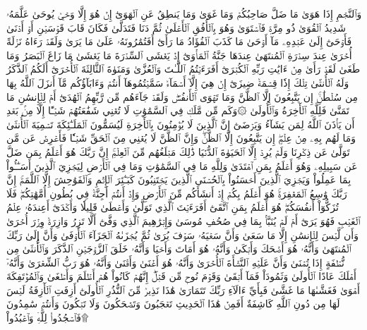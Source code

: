 وَٱلنَّجۡمِ إِذَا هَوَىٰ
مَا ضَلَّ صَاحِبُكُمۡ وَمَا غَوَىٰ
وَمَا يَنطِقُ عَنِ ٱلۡهَوَىٰٓ
إِنۡ هُوَ إِلَّا وَحۡيٞ يُوحَىٰ
عَلَّمَهُۥ شَدِيدُ ٱلۡقُوَىٰ
ذُو مِرَّةٖ فَٱسۡتَوَىٰ
وَهُوَ بِٱلۡأُفُقِ ٱلۡأَعۡلَىٰ
ثُمَّ دَنَا فَتَدَلَّىٰ
فَكَانَ قَابَ قَوۡسَيۡنِ أَوۡ أَدۡنَىٰ
فَأَوۡحَىٰٓ إِلَىٰ عَبۡدِهِۦ مَآ أَوۡحَىٰ
مَا كَذَبَ ٱلۡفُؤَادُ مَا رَأَىٰٓ
أَفَتُمَٰرُونَهُۥ عَلَىٰ مَا يَرَىٰ
وَلَقَدۡ رَءَاهُ نَزۡلَةً أُخۡرَىٰ
عِندَ سِدۡرَةِ ٱلۡمُنتَهَىٰ
عِندَهَا جَنَّةُ ٱلۡمَأۡوَىٰٓ
إِذۡ يَغۡشَى ٱلسِّدۡرَةَ مَا يَغۡشَىٰ
مَا زَاغَ ٱلۡبَصَرُ وَمَا طَغَىٰ
لَقَدۡ رَأَىٰ مِنۡ ءَايَٰتِ رَبِّهِ ٱلۡكُبۡرَىٰٓ
أَفَرَءَيۡتُمُ ٱللَّـٰتَ وَٱلۡعُزَّىٰ
وَمَنَوٰةَ ٱلثَّالِثَةَ ٱلۡأُخۡرَىٰٓ
أَلَكُمُ ٱلذَّكَرُ وَلَهُ ٱلۡأُنثَىٰ
تِلۡكَ إِذٗا قِسۡمَةٞ ضِيزَىٰٓ
إِنۡ هِيَ إِلَّآ أَسۡمَآءٞ سَمَّيۡتُمُوهَآ أَنتُمۡ وَءَابَآؤُكُم مَّآ أَنزَلَ ٱللَّهُ بِهَا مِن سُلۡطَٰنٍۚ إِن يَتَّبِعُونَ إِلَّا ٱلظَّنَّ وَمَا تَهۡوَى ٱلۡأَنفُسُۖ وَلَقَدۡ جَآءَهُم مِّن رَّبِّهِمُ ٱلۡهُدَىٰٓ
أَمۡ لِلۡإِنسَٰنِ مَا تَمَنَّىٰ
فَلِلَّهِ ٱلۡأٓخِرَةُ وَٱلۡأُولَىٰ
۞وَكَم مِّن مَّلَكٖ فِي ٱلسَّمَٰوَٰتِ لَا تُغۡنِي شَفَٰعَتُهُمۡ شَيۡـًٔا إِلَّا مِنۢ بَعۡدِ أَن يَأۡذَنَ ٱللَّهُ لِمَن يَشَآءُ وَيَرۡضَىٰٓ
إِنَّ ٱلَّذِينَ لَا يُؤۡمِنُونَ بِٱلۡأٓخِرَةِ لَيُسَمُّونَ ٱلۡمَلَـٰٓئِكَةَ تَسۡمِيَةَ ٱلۡأُنثَىٰ
وَمَا لَهُم بِهِۦ مِنۡ عِلۡمٍۖ إِن يَتَّبِعُونَ إِلَّا ٱلظَّنَّۖ وَإِنَّ ٱلظَّنَّ لَا يُغۡنِي مِنَ ٱلۡحَقِّ شَيۡـٔٗا
فَأَعۡرِضۡ عَن مَّن تَوَلَّىٰ عَن ذِكۡرِنَا وَلَمۡ يُرِدۡ إِلَّا ٱلۡحَيَوٰةَ ٱلدُّنۡيَا
ذَٰلِكَ مَبۡلَغُهُم مِّنَ ٱلۡعِلۡمِۚ إِنَّ رَبَّكَ هُوَ أَعۡلَمُ بِمَن ضَلَّ عَن سَبِيلِهِۦ وَهُوَ أَعۡلَمُ بِمَنِ ٱهۡتَدَىٰ
وَلِلَّهِ مَا فِي ٱلسَّمَٰوَٰتِ وَمَا فِي ٱلۡأَرۡضِ لِيَجۡزِيَ ٱلَّذِينَ أَسَـٰٓـُٔواْ بِمَا عَمِلُواْ وَيَجۡزِيَ ٱلَّذِينَ أَحۡسَنُواْ بِٱلۡحُسۡنَى
ٱلَّذِينَ يَجۡتَنِبُونَ كَبَـٰٓئِرَ ٱلۡإِثۡمِ وَٱلۡفَوَٰحِشَ إِلَّا ٱللَّمَمَۚ إِنَّ رَبَّكَ وَٰسِعُ ٱلۡمَغۡفِرَةِۚ هُوَ أَعۡلَمُ بِكُمۡ إِذۡ أَنشَأَكُم مِّنَ ٱلۡأَرۡضِ وَإِذۡ أَنتُمۡ أَجِنَّةٞ فِي بُطُونِ أُمَّهَٰتِكُمۡۖ فَلَا تُزَكُّوٓاْ أَنفُسَكُمۡۖ هُوَ أَعۡلَمُ بِمَنِ ٱتَّقَىٰٓ
أَفَرَءَيۡتَ ٱلَّذِي تَوَلَّىٰ
وَأَعۡطَىٰ قَلِيلٗا وَأَكۡدَىٰٓ
أَعِندَهُۥ عِلۡمُ ٱلۡغَيۡبِ فَهُوَ يَرَىٰٓ
أَمۡ لَمۡ يُنَبَّأۡ بِمَا فِي صُحُفِ مُوسَىٰ
وَإِبۡرَٰهِيمَ ٱلَّذِي وَفَّىٰٓ
أَلَّا تَزِرُ وَازِرَةٞ وِزۡرَ أُخۡرَىٰ
وَأَن لَّيۡسَ لِلۡإِنسَٰنِ إِلَّا مَا سَعَىٰ
وَأَنَّ سَعۡيَهُۥ سَوۡفَ يُرَىٰ
ثُمَّ يُجۡزَىٰهُ ٱلۡجَزَآءَ ٱلۡأَوۡفَىٰ
وَأَنَّ إِلَىٰ رَبِّكَ ٱلۡمُنتَهَىٰ
وَأَنَّهُۥ هُوَ أَضۡحَكَ وَأَبۡكَىٰ
وَأَنَّهُۥ هُوَ أَمَاتَ وَأَحۡيَا
وَأَنَّهُۥ خَلَقَ ٱلزَّوۡجَيۡنِ ٱلذَّكَرَ وَٱلۡأُنثَىٰ
مِن نُّطۡفَةٍ إِذَا تُمۡنَىٰ
وَأَنَّ عَلَيۡهِ ٱلنَّشۡأَةَ ٱلۡأُخۡرَىٰ
وَأَنَّهُۥ هُوَ أَغۡنَىٰ وَأَقۡنَىٰ
وَأَنَّهُۥ هُوَ رَبُّ ٱلشِّعۡرَىٰ
وَأَنَّهُۥٓ أَهۡلَكَ عَادًا ٱلۡأُولَىٰ
وَثَمُودَاْ فَمَآ أَبۡقَىٰ
وَقَوۡمَ نُوحٖ مِّن قَبۡلُۖ إِنَّهُمۡ كَانُواْ هُمۡ أَظۡلَمَ وَأَطۡغَىٰ
وَٱلۡمُؤۡتَفِكَةَ أَهۡوَىٰ
فَغَشَّىٰهَا مَا غَشَّىٰ
فَبِأَيِّ ءَالَآءِ رَبِّكَ تَتَمَارَىٰ
هَٰذَا نَذِيرٞ مِّنَ ٱلنُّذُرِ ٱلۡأُولَىٰٓ
أَزِفَتِ ٱلۡأٓزِفَةُ
لَيۡسَ لَهَا مِن دُونِ ٱللَّهِ كَاشِفَةٌ
أَفَمِنۡ هَٰذَا ٱلۡحَدِيثِ تَعۡجَبُونَ
وَتَضۡحَكُونَ وَلَا تَبۡكُونَ
وَأَنتُمۡ سَٰمِدُونَ
فَٱسۡجُدُواْۤ لِلَّهِۤ وَٱعۡبُدُواْ۩